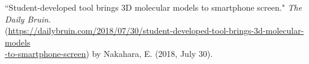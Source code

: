 \pubspace

``Student-developed tool brings 3D molecular models to smartphone screen." \textit{The Daily Bruin}. \\ (\textcolor{RoyalBlue}{\href{https://dailybruin.com/2018/07/30/student-developed-tool-brings-3d-molecular-models-to-smartphone-screen}{https://dailybruin.com/2018/07/30/student-developed-tool-brings-3d-molecular-models \\ -to-smartphone-screen}}) by Nakahara, E. (2018, July 30).